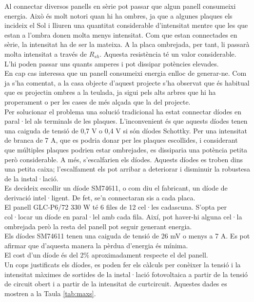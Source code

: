 \noindent Al connectar diversos panells en sèrie pot passar que algun panell consumeixi energia. Això és molt notori quan hi ha ombres, ja que a algunes plaques els incideix el Sol i lliuren una quantitat considerable d'intensitat mentre que les que estan a l'ombra donen molta menys intensitat. Com que estan connectades en sèrie, la intensitat ha de ser la mateixa. A la placa ombrejada, per tant, li passarà molta intensitat a través de $R_{sh}$. Aquesta resistència té un valor considerable. L'hi poden passar uns quants amperes i pot dissipar potències elevades.\\
\newline En cap cas interessa que un panell consumeixi energia enlloc de generar-ne. Com ja s'ha comentat, a la casa objecte d'aquest projecte s'ha observat que és habitual que es projectin ombres a la teulada, ja sigui pels alts arbres que hi ha properament o per les cases de més alçada que la del projecte.\\
\newline Per solucionar el problema una solució tradicional ha estat connectar díodes en paral·lel als terminals de les plaques. L'inconvenient és que aquests díodes tenen una caiguda de tensió de 0,7 V o 0,4 V si són díodes Schottky. Per una intensitat de branca de 7 A, que es podria donar per les plaques escollides, i considerant que múltiples plaques podrien estar ombrejades, es dissiparia una potència petita però considerable. A més, s'escalfarien els díodes. Aquests díodes es troben dins una petita caixa; l'escalfament els pot arribar a deteriorar i disminuir la robustesa de la instal·lació.\\
\newline Es decideix escollir un díode SM74611, o com diu el fabricant, un díode de derivació intel·ligent. De fet, se'n connectaran sis a cada placa.\\
\newline El panell GLC-P6/72 330 W té 6 files de 12 cel·les cadascuna. S'opta per col·locar un díode en paral·lel amb cada fila. Així, pot haver-hi alguna cel·la ombrejada però la resta del panell pot seguir generant energia.\\
\newline Els díodes SM74611 tenen una caiguda de tensió de 26 mV o menys a 7 A. Es pot afirmar que d'aquesta manera la pèrdua d'energia és mínima. \\
\newline El cost d'un díode és del 2\% aproximadament respecte el del panell.\\
%
%
\newline Un cops justificats els díodes, es poden fer els càlculs per conèixer la tensió i la intensitat màximes de sortides de la instal·lació fotovoltaica a partir de la tensió de circuit obert i a partir de la intensitat de curtcircuit. Aquestes dades es mostren a la Taula \ref{tab:maxs}.

